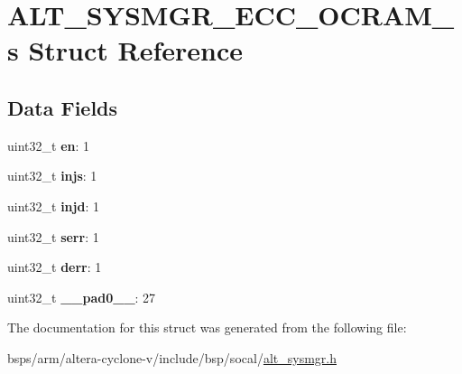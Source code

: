 \hypertarget{structALT__SYSMGR__ECC__OCRAM__s}{}\section{A\+L\+T\+\_\+\+S\+Y\+S\+M\+G\+R\+\_\+\+E\+C\+C\+\_\+\+O\+C\+R\+A\+M\+\_\+s Struct Reference}
\label{structALT__SYSMGR__ECC__OCRAM__s}
\subsection*{Data Fields}
\begin{DoxyCompactItemize}
\item 
\mbox{\label{structALT__SYSMGR__ECC__OCRAM__s_a406e9c72f69eb83e3980f32a2825a5aa}} 
uint32\+\_\+t {\bfseries en}\+: 1
\item 
\mbox{\label{structALT__SYSMGR__ECC__OCRAM__s_ac7f5e54742ee9376957f9d093013eba3}} 
uint32\+\_\+t {\bfseries injs}\+: 1
\item 
\mbox{\label{structALT__SYSMGR__ECC__OCRAM__s_a1e3220a5a1f7ebaa7f4315837854de71}} 
uint32\+\_\+t {\bfseries injd}\+: 1
\item 
\mbox{\label{structALT__SYSMGR__ECC__OCRAM__s_ab0adbf3aaea97b4df68de1139a742211}} 
uint32\+\_\+t {\bfseries serr}\+: 1
\item 
\mbox{\label{structALT__SYSMGR__ECC__OCRAM__s_ac7fa0b0ac190d0621f61a30711ff924d}} 
uint32\+\_\+t {\bfseries derr}\+: 1
\item 
\mbox{\label{structALT__SYSMGR__ECC__OCRAM__s_a8e6002faaae4ec101c25d25ecc05597e}} 
uint32\+\_\+t {\bfseries \+\_\+\+\_\+pad0\+\_\+\+\_\+}\+: 27
\end{DoxyCompactItemize}


The documentation for this struct was generated from the following file\+:\begin{DoxyCompactItemize}
\item 
bsps/arm/altera-\/cyclone-\/v/include/bsp/socal/\mbox{\hyperlink{alt__sysmgr_8h}{alt\+\_\+sysmgr.\+h}}\end{DoxyCompactItemize}
